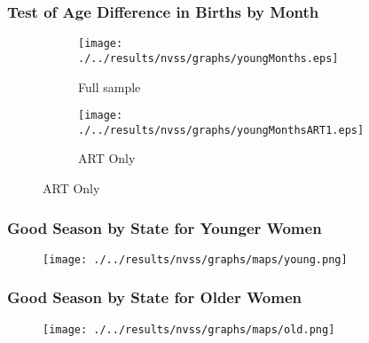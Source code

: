 \documentclass[10pt,letterpaper,subeqn]{beamer}
\begin{document}
\begin{frame}[label=Diff]
  \frametitle{Test of Age Difference in Births by Month}
\begin{figure}[htpb!]
\begin{center}
\caption{Birth Prevalence by Month, Age Group, and ART Usage}
\label{bqFig:concepMonth}
\begin{subfigure}{.5\textwidth}
  \centering
  \texttt{[image: ./../results/nvss/graphs/youngMonths.eps]}
  \caption{Full sample}
  \label{fig:concepAbs}
\end{subfigure}%
\begin{subfigure}{.5\textwidth}
  \centering
  \texttt{[image: ./../results/nvss/graphs/youngMonthsART1.eps]}
  \caption{ART Only}
  \label{fig:concepAbsART}
\end{subfigure}
\end{center}
\end{figure}
\vspace{6mm}
\hyperlink{MainDiff}{}
\end{frame}


\begin{frame}[label=USyoung]
  \frametitle{Good Season by State for Younger Women}
  \begin{figure}[htpb!]
    \begin{center}
      \centering
      \texttt{[image: ./../results/nvss/graphs/maps/young.png]}
      \label{fig:mapYoung}
    \end{center}
  \end{figure}
\end{frame}

\begin{frame}[label=USold]
  \frametitle{Good Season by State for Older Women}
  \begin{figure}[htpb!]
    \begin{center}
      \centering
      \texttt{[image: ./../results/nvss/graphs/maps/old.png]}
      \label{fig:mapOld}
    \end{center}
  \end{figure}
\hyperlink{weather}{}
\end{frame}
\end{document}
